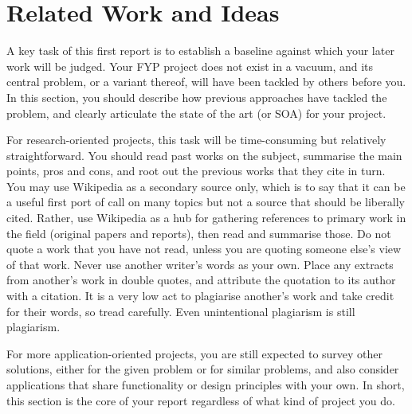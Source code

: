 \chapter{Related Work and Ideas}

A key task of this first report is to establish a baseline against which your later work will be judged. Your FYP project does not exist in a vacuum, and its central problem, or a variant thereof, will have been tackled by others before you. In this section, you should describe how previous approaches have tackled the problem, and clearly articulate the state of the art (or SOA) for your project.

For research-oriented projects, this task will be time-consuming but relatively straightforward. You should read past works on the subject, summarise the main points, pros and cons, and root out the previous works that they cite in turn. You may use Wikipedia as a secondary source only, which is to say that it can be a useful first port of call on many topics but not a source that should be liberally cited. Rather, use Wikipedia as a hub for gathering references to primary work in the field (original papers and reports), then read and summarise those. Do not quote a work that you have not read, unless you are quoting someone else’s view of that work. Never use another writer’s words as your own. Place any extracts from another’s work in double quotes, and attribute the quotation to its author with a citation. It is a very low act to plagiarise another’s work and take credit for their words, so tread carefully. Even unintentional plagiarism is still plagiarism.

For more application-oriented projects, you are still expected to survey other solutions, either for the given problem or for similar problems, and also consider applications that share functionality or design principles with your own. In short, this section is the core of your report regardless of what kind of project you do.
